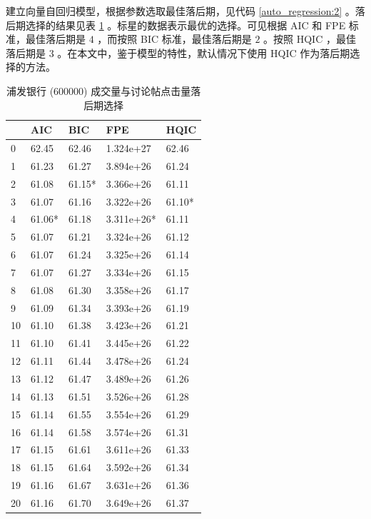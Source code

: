 建立向量自回归模型，根据参数选取最佳落后期，见代码 \ref{auto_regression:2} 。落后期选择的结果见表 \ref{auto_regression:1} 。标星的数据表示最优的选择。可见根据 AIC 和 FPE 标准，最佳落后期是 $4$ ，而按照 BIC 标准，最佳落后期是 $2$ 。按照 HQIC ，最佳落后期是 $3$ 。在本文中，鉴于模型的特性，默认情况下使用 HQIC 作为落后期选择的方法。

\begin{table}
  \centering
  \caption{浦发银行 (600000) 成交量与讨论帖点击量落后期选择}
  \label{auto_regression:1}
  \begin{tabularx}{0.75\textwidth}{XXXXX}
    \toprule
    & AIC & BIC & FPE & HQIC \\
    \midrule
    0 & 62.45 & 62.46 & 1.324e+27 & 62.46 \\
    1 & 61.23 & 61.27 & 3.894e+26 & 61.24 \\
    2 & 61.08 & 61.15* & 3.366e+26 & 61.11 \\
    3 & 61.07 & 61.16 & 3.322e+26 & 61.10* \\
    4 & 61.06* & 61.18 & 3.311e+26* & 61.11 \\
    5 & 61.07 & 61.21 & 3.324e+26 & 61.12 \\
    6 & 61.07 & 61.24 & 3.325e+26 & 61.14 \\
    7 & 61.07 & 61.27 & 3.334e+26 & 61.15 \\
    8 & 61.08 & 61.30 & 3.358e+26 & 61.17 \\
    9 & 61.09 & 61.34 & 3.393e+26 & 61.19 \\
    10 & 61.10 & 61.38 & 3.423e+26 & 61.21 \\
    11 & 61.10 & 61.41 & 3.445e+26 & 61.22 \\
    12 & 61.11 & 61.44 & 3.478e+26 & 61.24 \\
    13 & 61.12 & 61.47 & 3.489e+26 & 61.26 \\
    14 & 61.13 & 61.51 & 3.526e+26 & 61.28 \\
    15 & 61.14 & 61.55 & 3.554e+26 & 61.29 \\
    16 & 61.14 & 61.58 & 3.574e+26 & 61.31 \\
    17 & 61.15 & 61.61 & 3.611e+26 & 61.33 \\
    18 & 61.15 & 61.64 & 3.592e+26 & 61.34 \\
    19 & 61.16 & 61.67 & 3.631e+26 & 61.36 \\
    20 & 61.16 & 61.70 & 3.649e+26 & 61.37 \\
    \bottomrule
  \end{tabularx}
\end{table}

